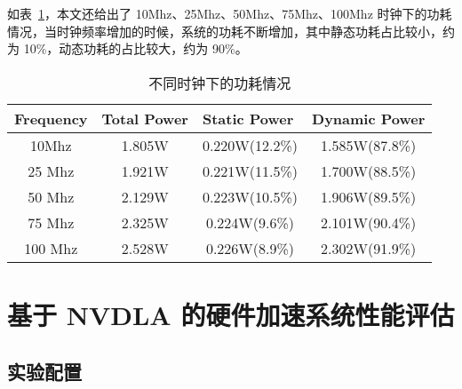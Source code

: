 如表~\ref{tab:10-100 Mhz Power}，本文还给出了 10Mhz、25Mhz、50Mhz、75Mhz、100Mhz 时钟下的功耗情况，当时钟频率增加的时候，系统的功耗不断增加，其中静态功耗占比较小，约为 10\%，动态功耗的占比较大，约为 90\%。

\begin{table}[!htbp]
    \caption{不同时钟下的功耗情况}
    \label{tab:10-100 Mhz Power}
    \centering
    \footnotesize%
    \setlength{\tabcolsep}{4pt}%
    \renewcommand{\arraystretch}{1.2}%
    \begin{tabular}{cccc}
        \toprule
        \multicolumn{1}{l}{\textbf{Frequency}} & \multicolumn{1}{l}{\textbf{Total Power}} & \multicolumn{1}{l}{\textbf{Static Power}} & \multicolumn{1}{l}{\textbf{Dynamic Power}} \\
        \midrule
        10Mhz                                  & 1.805W                                   & 0.220W(12.2\%)                            & 1.585W(87.8\%)                             \\
        25 Mhz                                 & 1.921W                                   & 0.221W(11.5\%)                            & 1.700W(88.5\%)                             \\
        50 Mhz                                 & 2.129W                                   & 0.223W(10.5\%)                            & 1.906W(89.5\%)                             \\
        75 Mhz                                 & 2.325W                                   & 0.224W(9.6\%)                             & 2.101W(90.4\%)                             \\
        100 Mhz                                & 2.528W                                   & 0.226W(8.9\%)                             & 2.302W(91.9\%)                             \\
        \bottomrule                   
    \end{tabular}
\end{table}

\section{基于 NVDLA 的硬件加速系统性能评估}

\subsection{实验配置}

